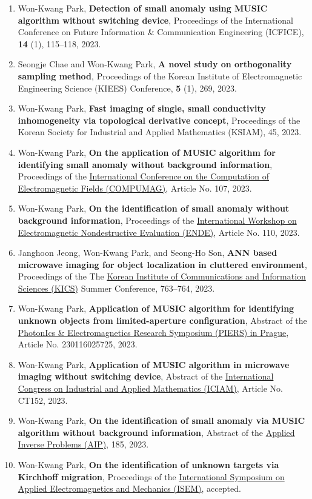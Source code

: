 \documentclass[10pt,A4]{article}
\begin{document}
\begin{enumerate}
\item\label{C-ICFICE2023} Won-Kwang Park, \textbf{Detection of small anomaly using MUSIC algorithm without switching device}, Proceedings of the  International Conference on Future Information \& Communication Engineering (ICFICE), \textbf{14} (1), 115--118, 2023.
\item\label{C-KIEES2023} Seongje Chae and Won-Kwang Park, \textbf{A novel study on orthogonality sampling method}, Proceedings of the Korean Institute of Electromagnetic Engineering Science (KIEES) Conference, \textbf{5} (1), 269, 2023.
\item\label{C-KSIAM2023} Won-Kwang Park, \textbf{Fast imaging of single, small conductivity inhomogeneity via topological derivative concept}, Proceedings of the Korean Society for Industrial and Applied Mathematics (KSIAM), 45, 2023.
\item\label{C-COMPUMAG2023} Won-Kwang Park, \textbf{On the application of MUSIC algorithm for identifying small anomaly without background information}, Proceedings of the \href{https://www.compumag2023.com/}{ International Conference on the Computation of Electromagnetic Fields (COMPUMAG)}, Article No. 107, 2023.
\item\label{C-ENDE2023} Won-Kwang Park, \textbf{On the identification of small anomaly without background information}, Proceedings of the \href{https://www.ende2023.gr}{ International Workshop on Electromagnetic Nondestructive Evaluation (ENDE)}, Article No. 110, 2023.
\item\label{C-KICS2023} Janghoon Jeong, Won-Kwang Park, and Seong-Ho Son, \textbf{ANN based microwave imaging for object localization in cluttered environment}, Proceedings of the The \href{https://eng.kics.or.kr/html/?pmode=english}{Korean Institute of Communications and Information Sciences (KICS)} Summer Conference, 763--764, 2023.
\item\label{C-PIERS2023} Won-Kwang Park, \textbf{Application of MUSIC algorithm for identifying unknown objects from limited-aperture configuration}, Abstract of the \href{https://prague2023.piers.org}{PhotonIcs \& Electromagnetics Research Symposium (PIERS) in Prague}, Article No. 230116025725, 2023.
\item\label{C-ICIAM2023} Won-Kwang Park, \textbf{Application of MUSIC algorithm in microwave imaging without switching device}, Abstract of the \href{https://iciam2023.org}{ International Congress on Industrial and Applied Mathematics (ICIAM)}, Article No. CT152, 2023.
\item\label{C-AIP2023} Won-Kwang Park, \textbf{On the identification of small anomaly via MUSIC algorithm without background information}, Abstract of the \href{http://www.aip2023.de}{Applied Inverse Problems (AIP)}, 185, 2023.
\item\label{C-ISEM2023} Won-Kwang Park, \textbf{On the identification of unknown targets via Kirchhoff migration}, Proceedings of the \href{https://www.isem2023.org}{ International Symposium on Applied Electromagnetics and Mechanics (ISEM)}, accepted.
\end{enumerate}
\end{document}
